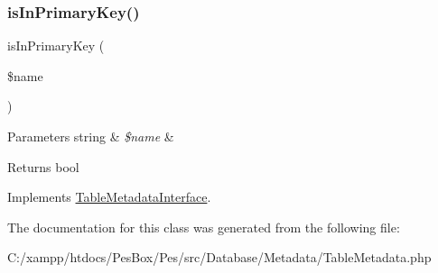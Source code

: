 \subsubsection{\texorpdfstring{is\+In\+Primary\+Key()}{isInPrimaryKey()}}
{\footnotesize\ttfamily is\+In\+Primary\+Key (\begin{DoxyParamCaption}\item[{}]{\$name }\end{DoxyParamCaption})}


\begin{DoxyParams}[1]{Parameters}
string & {\em \$name} & \\
\hline
\end{DoxyParams}
\begin{DoxyReturn}{Returns}
bool 
\end{DoxyReturn}


Implements \mbox{\hyperlink{interface_pes_1_1_database_1_1_metadata_1_1_table_metadata_interface}{Table\+Metadata\+Interface}}.



The documentation for this class was generated from the following file\+:\begin{DoxyCompactItemize}
\item 
C\+:/xampp/htdocs/\+Pes\+Box/\+Pes/src/\+Database/\+Metadata/Table\+Metadata.\+php\end{DoxyCompactItemize}
